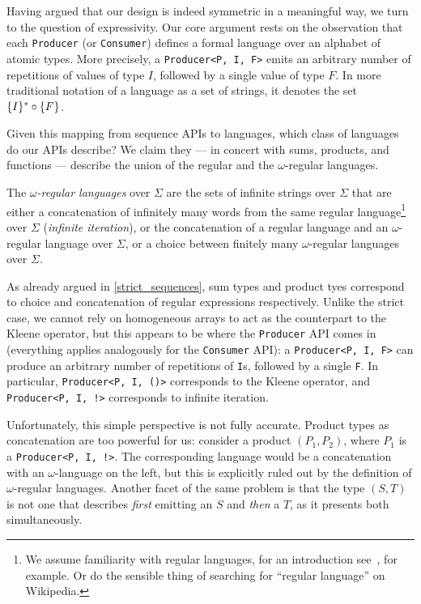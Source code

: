 \documentclass[sigplan,screen,10pt,anonymous,review]{acmart}
\begin{document}
Having argued that our design is indeed symmetric in a meaningful way, we turn to the question of expressivity. Our core argument rests on the observation that each \texttt{Producer} (or \texttt{Consumer}) defines a formal language over an alphabet of atomic types. More precisely, a \texttt{Producer<P, I, F>} emits an arbitrary number of repetitions of values of type $I$, followed by a single value of type $F$. In more traditional notation of a language as a set of strings, it denotes the set $\{I\}^{\ast} \circ \{F\}$.

Given this mapping from sequence APIs to languages, which class of languages do our APIs describe? We claim they --- in concert with sums, products, and functions --- describe the union of the regular and the $\omega$-regular languages.

The \textit{$\omega$-regular languages} over $\Sigma$ are the sets of infinite strings over $\Sigma$ that are either a concatenation of infinitely many words from the same regular language\footnote{We assume familiarity with regular languages, for an introduction see~\cite{hopcroft1969formal}, for example. Or do the sensible thing of searching for ``regular language'' on Wikipedia.} over $\Sigma$ (\textit{infinite iteration}), or the concatenation of a regular language and an $\omega$-regular language over $\Sigma$, or a choice between finitely many $\omega$-regular languages over $\Sigma$.

As already argued in \cref{strict_sequences}, sum types and product tyes correspond to choice and concatenation of regular expressions respectively. Unlike the strict case, we cannot rely on homogeneous arrays to act as the counterpart to the Kleene operator, but this appears to be where the \texttt{Producer} API comes in (everything applies analogously for the \texttt{Consumer} API): a \texttt{Producer<P, I, F>} can produce an arbitrary number of repetitions of \texttt{I}s, followed by a single \texttt{F}. In particular, \texttt{Producer<P, I, ()>} corresponds to the Kleene operator, and \texttt{Producer<P, I, !>} corresponds to infinite iteration.

Unfortunately, this simple perspective is not fully accurate. Product types as concatenation are too powerful for us: consider a product $(P_1, P_2)$, where $P_1$ is a \texttt{Producer<P, I, !>}. The corresponding language would be a concatenation with an $\omega$-language on the left, but this is explicitly ruled out by the definition of $\omega$-regular languages. Another facet of the same problem is that the type $(S, T)$ is not one that describes \textit{first} emitting an $S$ and \textit{then} a $T$, as it presents both simultaneously.
\end{document}
